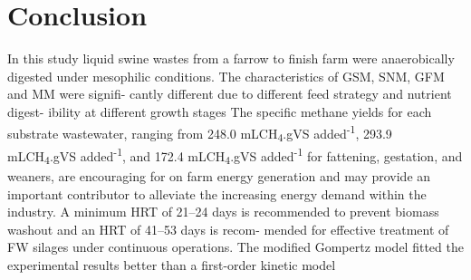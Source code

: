 \section{Conclusion}
In this study liquid swine wastes from a farrow to finish farm were anaerobically digested under mesophilic conditions. The characteristics of GSM, SNM, GFM and MM were signifi-
cantly different due to different feed strategy and nutrient digest- ibility at different growth stages The specific methane yields for each substrate wastewater, ranging from 248.0 mLCH\textsubscript{4}.gVS added\textsuperscript{-1}, 293.9 mLCH\textsubscript{4}.gVS added\textsuperscript{-1}, and 172.4 mLCH\textsubscript{4}.gVS added\textsuperscript{-1} for fattening, gestation, and weaners, are encouraging for on farm energy generation and may provide an important contributor to alleviate the increasing energy demand within the industry. A minimum HRT of 21–24 days is recommended to prevent biomass washout and an HRT of 41–53 days is recom- mended for effective treatment of FW silages under continuous operations. The modified Gompertz model fitted the experimental results better than a first-order kinetic model